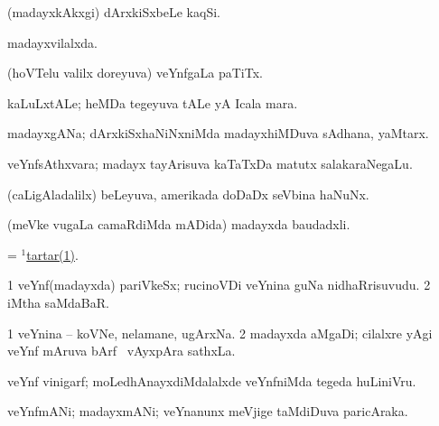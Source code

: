 \bentry
{}
\gl{\nA}
\bmng
(madayxkAkxgi) dArxkiSxbeLe kaqSi. 
\emng
\eentry

\bentry
{}
\gl{\gu}
\bmng
madayxvilalxda. 
\emng
\eentry

\bentry
{}
\gl{\nA}
\bmng
(hoVTelu \mo valilx doreyuva) veYnfgaLa paTiTx. 
\emng
\eentry

\bentry
{}
\gl{\nA}
\bmng
kaLuLxtALe; heMDa tegeyuva tALe yA Icala mara. 
\emng
\eentry

\bentry
{}
\gl{\nA}
\bmng
madayxgANa; dArxkiSxhaNiNxniMda madayxhiMDuva sAdhana, yaMtarx. 
\emng
\eentry

\bentry
{}
\gl{\nA}
\bmng
veYnfsAthxvara; madayx tayArisuva kaTaTxDa matutx salakaraNegaLu. 
\emng
\eentry

\bentry
{}
\gl{\nA}
\bmng
(caLigAladalilx) beLeyuva, amerikada doDaDx seVbina haNuNx. 
\emng
\eentry

\bentry
{}
\gl{\nA}
\bmng
(meVke \mo vugaLa camaRdiMda mADida) madayxda baudadxli. 
\emng
\eentry

\bentry
{}
\gl{\nA}
\bmng
= \hyperref{kandict_t.pdf}{T}{tartar(1)}{$^1$tartar(1)}. 
\emng
\eentry

\bentry
{}
\gl{\nA}
\bmng
\bnum
\num{1} veYnf(madayxda) pariVkeSx; rucinoVDi veYnina guNa nidhaRrisuvudu. 
\num{2} iMtha saMdaBaR. 
\enum
\emng
\eentry

\bentry
{}
\gl{\nA}
\bmng
\bnum
\num{1} veYnina -- koVNe, nelamane, ugArxNa. 
\num{2} madayxda aMgaDi; cilalxre yAgi veYnf mAruva bArf \mo\ vAyxpAra sathxLa. 
\enum
\emng
\eentry

\bentry
{}
\gl{\nA}
\bmng
veYnf vinigarf; moLedhAnayxdiMdalalxde veYnfniMda tegeda huLiniVru. 
\emng
\eentry

\bentry
{}
\gl{\nA}
\bmng
veYnfmANi; madayxmANi; veYnanunx meVjige taMdiDuva paricAraka. 
\emng
\eentry

